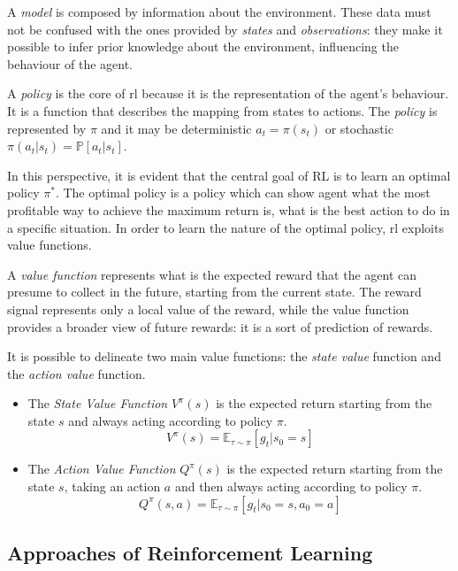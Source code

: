A \textit{model} is composed by information about the environment. These data must not be confused with the ones provided by \textit{states} and \textit{observations}: they make it possible to infer prior knowledge about the environment, influencing the behaviour of the agent.

A \textit{policy} is the core of \acrshort{rl} because it is the representation of the agent's behaviour. It is a function that describes the mapping from states to actions.  The \textit{policy} is represented by $\pi$ and it may be deterministic  $a_t = \pi(s_t)$  or stochastic $\pi(a_t|s_t) = \mathbb{P}[a_t | s_t]$.

In this perspective, it is evident that the central goal of RL is to learn an optimal policy $\pi^*$. The optimal policy is a policy which can show agent what the most profitable way to achieve the maximum return is, what is the best action to do in a specific situation. In order to learn the nature of the optimal policy, \acrshort{rl} exploits value functions.

A \textit{value function} represents what is the expected reward that the agent can presume to collect in the future, starting from the current state. The reward signal represents only a local value of the reward, while the value function provides a broader view of future rewards: it is a sort of prediction of rewards.

It is possible to delineate two main value functions: the \textit{state value} function and the \textit{action value} function.

\begin{itemize}
	\item The \textit{State Value Function} $V^\pi(s)$ is the expected return starting from the state $s$ and always acting according to policy $\pi$.
	\begin{equation} \label{eq:statevalue}
		V^\pi(s) = \mathbb{E}_{\tau \sim \pi}[g_t | s_0 = s]
	\end{equation}
	\item The \textit{Action Value Function} $Q^\pi(s)$ is the expected return starting from the state $s$, taking an action $a$ and then always acting according to policy $\pi$.
	\begin{equation} \label{eq:actionvalue}
	Q^\pi(s, a) = \mathbb{E}_{\tau \sim \pi}[g_t | s_0 = s, a_0 = a]
	\end{equation}
\end{itemize}


\subsection{Approaches of Reinforcement Learning}

